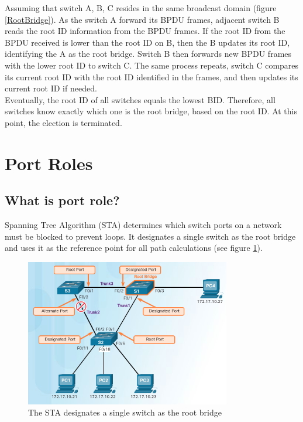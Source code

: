  
Assuming that switch A, B, C resides in the same broadcast domain (figure \ref{RootBridge}). As the switch A forward its BPDU frames, adjacent switch B reads the root ID information from the BPDU frames. If the root ID from the BPDU received is lower than the root ID on B, then the B updates its root ID, identifying the A as the root bridge. Switch B then forwards new BPDU frames with the lower root ID to switch C. The same process repeats, switch C compares its current root ID with the root ID identified in the frames, and then updates its current root ID if needed. \\

Eventually, the root ID of all switches equals the lowest BID. Therefore, all switches know exactly which one is the root bridge, based on the root ID. At this point, the election is terminated.

\section{Port Roles}

\subsection{What is port role?}
Spanning Tree Algorithm (STA) determines which switch ports on a network must be blocked to prevent loops. It designates a single switch as the root bridge and uses it as the reference point for all path calculations (see figure \ref{STP-operation}).\\
 
\begin{figure}[hbtp]
\centering
\includegraphics[width=0.8\textwidth]{pictures/STP-operation.png}
\caption{The STA designates a single switch as the root bridge}
\label{STP-operation}
\end{figure}

